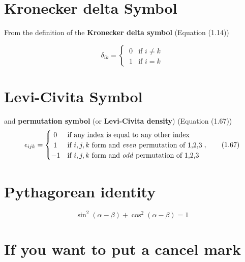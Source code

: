 \documentclass[a4paper]{article}
\begin{document}
\Large

\section{Kronecker delta Symbol}

From the definition of the \textbf{Kronecker delta symbol} (Equation (1.14))

\begin{equation}
	\delta_{ik} = 
	  \begin{cases}
	  	\ 0 & \text{if } i \neq k \\
	    \ 1 & \text{if } i = k
	  \end{cases}  \tag{1.14}
\end{equation}

\section{Levi-Civita Symbol}

and \textbf{permutation symbol} (or \textbf{Levi-Civita density}) (Equation (1.67))
\begin{equation}
	\epsilon_{ijk} = 
	  \begin{cases}
	  	\ 0  & \text{if any index is equal to any other index} \\
	  	\ 1  & \text{if $i,j,k$ form and \textit{even} permutation of 1,2,3}\\
	  	-1 & \text{if $i,j,k$ form and \textit{odd} permutation of 1,2,3}
	  \end{cases},  \tag{1.67}
\end{equation}


\section{Pythagorean identity}

\begin{equation}
  \sin^2(\alpha-\beta)+\cos^2(\alpha-\beta) = 1
\end{equation}


\section{If you want to put a cancel mark}

\begin{comment}
\cancel{}
\end{comment}
\end{document}
